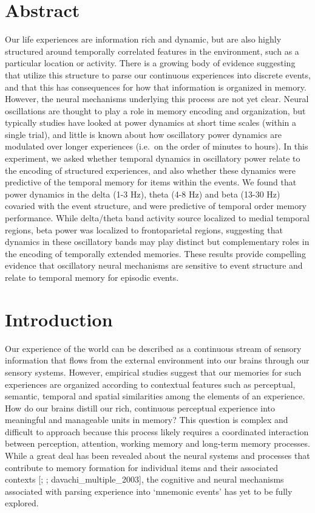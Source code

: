 \section{Abstract}\label{abstract}

Our life experiences are information rich and dynamic, but are also
highly structured around temporally correlated features in the
environment, such as a particular location or activity. There is a
growing body of evidence suggesting that utilize this structure to parse
our continuous experiences into discrete events, and that this has
consequences for how that information is organized in memory. However,
the neural mechanisms underlying this process are not yet clear. Neural
oscillations are thought to play a role in memory encoding and
organization, but typically studies have looked at power dynamics at
short time scales (within a single trial), and little is known about how
oscillatory power dynamics are modulated over longer experiences
(i.e.~on the order of minutes to hours). In this experiment, we asked
whether temporal dynamics in oscillatory power relate to the encoding of
structured experiences, and also whether these dynamics were predictive
of the temporal memory for items within the events. We found that power
dynamics in the delta (1-3 Hz), theta (4-8 Hz) and beta (13-30 Hz)
covaried with the event structure, and were predictive of temporal order
memory performance. While delta/theta band activity source localized to
medial temporal regions, beta power was localized to frontoparietal
regions, suggesting that dynamics in these oscillatory bands may play
distinct but complementary roles in the encoding of temporally extended
memories. These results provide compelling evidence that oscillatory
neural mechanisms are sensitive to event structure and relate to
temporal memory for episodic events.

\section{Introduction}\label{introduction}

Our experience of the world can be described as a continuous stream of
sensory information that flows from the external environment into our
brains through our sensory systems. However, empirical studies suggest
that our memories for such experiences are organized according to
contextual features such as perceptual, semantic, temporal and spatial
similarities among the elements of an experience. How do our brains
distill our rich, continuous perceptual experience into meaningful and
manageable units in memory? This question is complex and difficult to
approach because this process likely requires a coordinated interaction
between perception, attention, working memory and long-term memory
processes. While a great deal has been revealed about the neural systems
and processes that contribute to memory formation for individual items
and their associated contexts {[}\textcite{davachi_item_2006};
\textcite{ranganath_neural_2003}; davachi\_multiple\_2003{]}, the
cognitive and neural mechanisms associated with parsing experience into
`mnemonic events' has yet to be fully explored.


